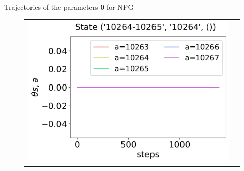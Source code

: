 \documentclass[10pt, aspectratio=169, compress, protectframetitle, handout]{beamer}
\begin{document}
\begin{frame}{Trajectories of the parameters $\boldsymbol \theta$ for NPG}
\begin{figure}
\begin{tabular}{cc}
            \hspace*{-26.7pt}\includegraphics[scale=0.34,valign=b]{figures/theta_NPG_state_3.png}
        \end{tabular}
    \end{figure}
    
\end{frame}
\end{document}

